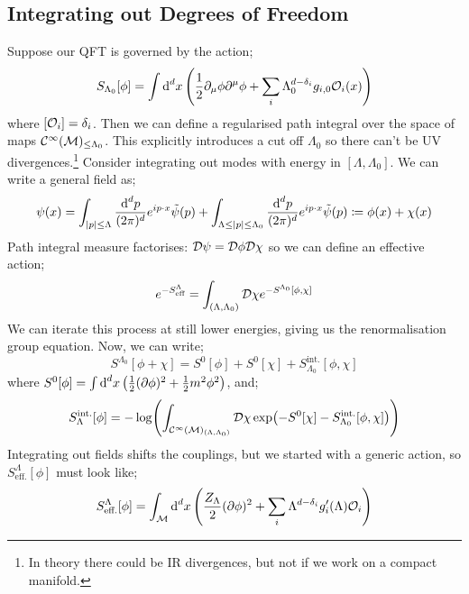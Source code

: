 \subsection{Integrating out Degrees of Freedom}
Suppose our QFT is governed by the action;
\begin{equation}
S_{\Lambda_0}[\phi] = \int{\upd{^d x}\left(\frac{1}{2}\del_\mu \phi \del^\mu \phi + \sum_{i}{\Lambda_0^{d - \delta_i}g_{i,0}\mO_i(x)}\right)}
\end{equation}
where $[\mathcal{O}_i] = \delta_i$. Then we can define a regularised path integral over the space of maps $\mathcal{C}^{\infty}(\mathcal{M})_{\leq \Lambda_0}$. This explicitly introduces a cut off $\Lambda_0$ so there can't be UV divergences.\footnote{In theory there could be IR divergences, but not if we work on a compact manifold.} Consider integrating out modes with energy in $[\Lambda, \Lambda_0]$. We can write a general field as;
\begin{equation*}
\psi(x) = \int_{\abs{p} \leq \Lambda}{\frac{\ud^d p}{(2\pi)^d}e^{ip\cdot x}\tilde{\psi}(p)} +  \int_{\Lambda \leq \abs{p} \leq \Lambda_0}{\frac{\ud^d p}{(2\pi)^d}e^{ip\cdot x}\tilde{\psi}(p)} \coloneqq \phi(x) + \chi(x)
\end{equation*}
Path integral measure factorises: $\mathcal{D} \psi = \mathcal{D} \phi \mathcal{D} \chi$ so we can define an effective action;
\begin{equation}
e^{-S^{\Lambda}_{\text{eff}}} = \int_{(\Lambda, \Lambda_0)}{\mathcal{D} \chi e^{-S^{\Lambda_0}[\phi, \chi]}}
\end{equation}
We can iterate this process at still lower energies, giving us the renormalisation group equation. Now, we can write;
\begin{equation}
S^{\Lambda_0}[\phi + \chi] = S^{0}[\phi] + S^{0}[\chi] + S_{\Lambda_0}^{\text{int.}}[\phi, \chi]
\end{equation}
where $S^{0}[\phi] = \int{\upd{^d x}\left(\tfrac{1}{2}(\del \phi)^2 + \tfrac{1}{2}m^2 \phi^2\right)}$, and;
\begin{equation*}
S_{\Lambda}^{\text{int.}}[\phi] = -\log\left(\int_{\mC^{\infty}(\mM)_{(\Lambda, \Lambda_0)}}{\mD \chi \exp\left(-S^{0}[\chi] - S_{\Lambda_0}^{\text{int.}}[\phi, \chi]\right)}\right)
\end{equation*}
Integrating out fields shifts the couplings, but we started with a generic action, so $S_{\text{eff.}}^{\Lambda}[\phi]$ must look like;
\begin{equation*}
S_{\text{eff.}}^{\Lambda}[\phi] = \int_{\mM}{\upd{^d x}\left(\frac{Z_\Lambda}{2}(\del \phi)^2 + \sum_{i}{\Lambda^{d - \delta_i}g_i\pr(\Lambda)\mO_i}\right)}
\end{equation*}
